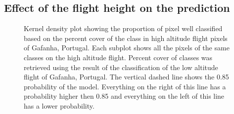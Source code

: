 \documentclass[
  number]{elsarticle}
\begin{document}
\subsection{Effect of the flight height on the
prediction}\label{effect-of-the-flight-height-on-the-prediction}

\label{cell-fig-upscaling}
\begin{figure}[H]


\caption{\label{fig-upscaling}Kernel density plot showing the proportion
of pixel well classified based on the percent cover of the class in high
altitude flight pixels of Gafanha, Portugal. Each subplot shows all the
pixels of the same classes on the high altitude flight. Percent cover of
classes was retrieved using the result of the classification of the low
altitude flight of Gafanha, Portugal. The vertical dashed line shows the
0.85 probability of the model. Everything on the right of this line has
a probability higher then 0.85 and everything on the left of this line
has a lower probability.}

\end{figure}%
\end{document}
